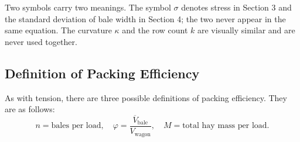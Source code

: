 %            

Two symbols carry two meanings. The symbol $\sigma$ denotes stress in Section 3 and the standard deviation of bale width in Section 4; the two never appear in the same equation. The curvature $\kappa$ and the row count $k$ are visually similar and are never used together.

\subsection{Definition of Packing Efficiency}
As with tension, there are three possible definitions of packing efficiency. They are as follows:
\[
n=\text{bales per load},\quad \varphi=\frac{\overline{V}_{\text{bale}}}{V_{\text{wagon}}},\quad M = \text{total hay mass per load.}
\]
